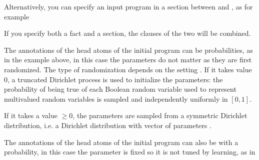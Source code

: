 \documentclass[letterpaper,10pt,english]{sphinxmanual}
\begin{document}
Alternatively, you can specify an input program in a section between  and , as for example

\begin{sphinxVerbatim}[commandchars=\\\{\}]
 

 
 
 

 
\end{sphinxVerbatim}

If you specify both a  fact and a section, the clauses of the two will be combined.

The annotations of the head atoms of the initial program can be probabilities, as in the example above, in this case the parameters do not matter as they are first randomized. The type of randomization depends on the setting .
If it takes value 0, a truncated Dirichlet process is used to initialize the parameters: the probability of being true of each Boolean random variable used to represent multivalued random variables is sampled and independently uniformly in \([0,1]\).

If it takes a value \(\geq 0\), the parameters are sampled from a symmetric Dirichlet distribution, i.e. a Dirichlet distribution with vector of parameters .

The annotations of the head atoms of the initial program can also be  with  a probability, in this case the parameter is fixed so it is not tuned by learning, as in

\begin{sphinxVerbatim}[commandchars=\\\{\}]
\PYG{p}{[} 
         
        \PYG{p}{]}
\end{sphinxVerbatim}
\end{document}
